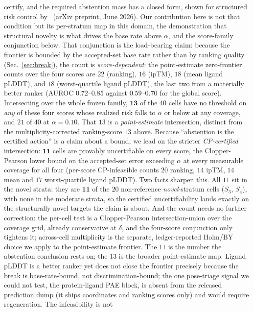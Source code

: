\documentclass[10pt]{article}
\begin{document}
certify, and the required abstention mass has a closed form, shown for structured risk control
by~\citet{crcgupta} (arXiv preprint, June 2026). Our contribution here is not that condition but its
per-stratum map in this domain, the demonstration that structural novelty is what drives the base rate above
$\alpha$, and the score-family conjunction below. That conjunction is the load-bearing claim: because the
frontier is bounded by the accepted-set base rate rather than by ranking quality (Sec.~\ref{sec:break}), the
count is \emph{score-dependent}: the point-estimate zero-frontier counts over the four scores are $22$
(ranking), $16$ (ipTM), $18$ (mean ligand pLDDT), and $18$ (worst-quartile ligand pLDDT), the last two from
a materially better ranker (AUROC $0.72$--$0.85$ against $0.59$--$0.70$ for the global score). Intersecting
over the whole frozen family, $\mathbf{13}$ of the $40$ cells have no threshold on \emph{any} of these four
scores whose realized risk falls to $\alpha$ or below at any coverage, and $21$ of $40$ at $\alpha=0.10$.
That $13$ is a \emph{point-estimate} intersection, distinct from the multiplicity-corrected ranking-score
$13$ above. Because ``abstention is the certified action'' is a claim about a bound, we lead on the stricter
\emph{CP-certified} intersection: $\mathbf{11}$ cells are provably uncertifiable on every score, the
Clopper-Pearson lower bound on the accepted-set error exceeding $\alpha$ at every measurable coverage for all
four (per-score CP-infeasible counts $20$ ranking, $14$ ipTM, $14$ mean and $17$ worst-quartile ligand
pLDDT). Two facts sharpen this. All $11$ sit in the novel strata: they are $\mathbf{11}$ of the $20$
non-reference \emph{novel}-stratum cells ($S_3$, $S_4$), with none in the moderate strata, so the certified
uncertifiability lands exactly on the structurally novel targets the claim is about. And the count needs no
further correction: the per-cell test is a Clopper-Pearson intersection-union over the coverage grid, already
conservative at $\delta$, and the four-score conjunction only tightens it; across-cell multiplicity is the
separate, ledger-reported Holm/BY choice we apply to the point-estimate frontier. The $11$ is the number the
abstention conclusion rests on; the $13$ is the broader point-estimate map. Ligand pLDDT is a better ranker yet does
not close the frontier precisely because the break is base-rate-bound, not discrimination-bound; the one
pose-triage signal we could not test, the protein-ligand PAE block, is absent from the released prediction
dump (it ships coordinates and ranking scores only) and would require regeneration. The infeasibility is not
\end{document}
